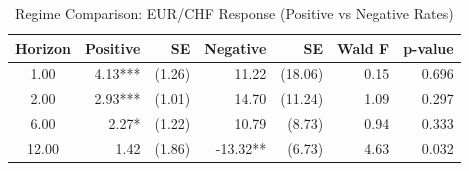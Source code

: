 \begin{table}[ht]
\centering
\caption{Regime Comparison: EUR/CHF Response (Positive vs Negative Rates)} 
\label{tab:lp_fx_regime}
\begin{tabular}{crrrrrr}
  \toprule
Horizon & Positive & SE & Negative & SE & Wald F & p-value \\ 
  \midrule
1.00 & 4.13*** & (1.26) & 11.22 & (18.06) & 0.15 & 0.696 \\ 
  2.00 & 2.93*** & (1.01) & 14.70 & (11.24) & 1.09 & 0.297 \\ 
  6.00 & 2.27* & (1.22) & 10.79 & (8.73) & 0.94 & 0.333 \\ 
  12.00 & 1.42 & (1.86) & -13.32** & (6.73) & 4.63 & 0.032 \\ 
   \bottomrule
\end{tabular}
\end{table}

